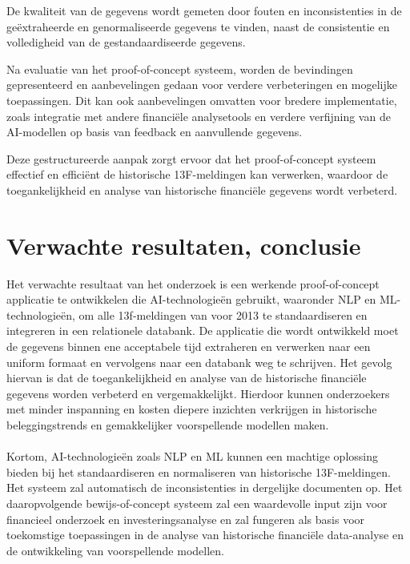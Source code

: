 De kwaliteit van de gegevens wordt gemeten door fouten en inconsistenties in de geëxtraheerde en genormaliseerde gegevens te vinden, naast de consistentie en volledigheid van de gestandaardiseerde gegevens.


Na evaluatie van het proof-of-concept systeem, worden de bevindingen gepresenteerd en aanbevelingen gedaan voor verdere verbeteringen en mogelijke toepassingen. Dit kan ook aanbevelingen omvatten voor bredere implementatie, zoals integratie met andere financiële analysetools en verdere verfijning van de AI-modellen op basis van feedback en aanvullende gegevens.

Deze gestructureerde aanpak zorgt ervoor dat het proof-of-concept systeem effectief en efficiënt de historische 13F-meldingen kan verwerken, waardoor de toegankelijkheid en analyse van historische financiële gegevens wordt verbeterd.



\section{Verwachte resultaten, conclusie}%
\label{sec:verwachte_resultaten}


Het verwachte resultaat van het onderzoek is een werkende proof-of-concept applicatie te ontwikkelen die AI-technologieën gebruikt, waaronder NLP en ML- technologieën, om alle 13f-meldingen van voor 2013 te standaardiseren en integreren in een relationele databank. De applicatie die wordt ontwikkeld moet de gegevens binnen ene acceptabele tijd extraheren en verwerken naar een uniform formaat en vervolgens naar een databank weg te schrijven.  Het gevolg hiervan is dat de toegankelijkheid en analyse van de historische financiële gegevens worden verbeterd en vergemakkelijkt. Hierdoor kunnen onderzoekers met minder inspanning en kosten diepere inzichten verkrijgen in historische beleggingstrends en gemakkelijker voorspellende modellen maken. 
\\
\\
Kortom, AI-technologieën zoals NLP en ML kunnen een machtige oplossing bieden bij het standaardiseren en normaliseren van historische 13F-meldingen. Het systeem zal automatisch de inconsistenties in dergelijke documenten op. Het daaropvolgende bewijs-of-concept systeem zal een waardevolle input zijn voor financieel onderzoek en investeringsanalyse en zal fungeren als basis voor toekomstige toepassingen in de analyse van historische financiële data-analyse en de ontwikkeling van voorspellende modellen.
